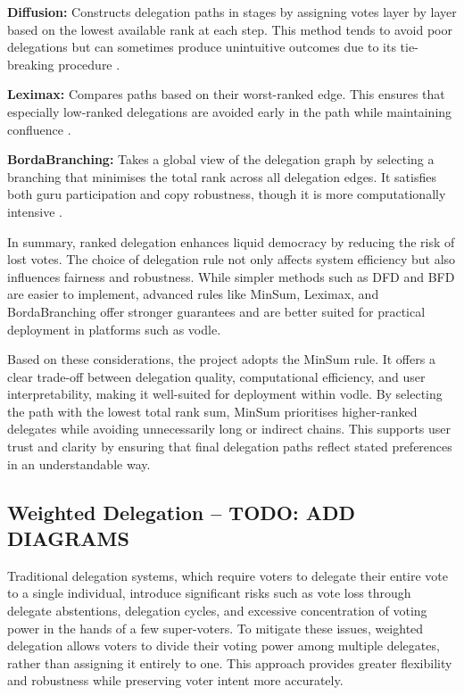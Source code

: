 \textbf{Diffusion:} Constructs delegation paths in stages by assigning votes layer by layer based on the lowest available rank at each step. This method tends to avoid poor delegations but can sometimes produce unintuitive outcomes due to its tie-breaking procedure \citep{brill_liquid_2022}.

\textbf{Leximax:} Compares paths based on their worst-ranked edge. This ensures that especially low-ranked delegations are avoided early in the path while maintaining confluence \citep{brill_liquid_2022}.

\textbf{BordaBranching:} Takes a global view of the delegation graph by selecting a branching that minimises the total rank across all delegation edges. It satisfies both guru participation and copy robustness, though it is more computationally intensive \citep{brill_liquid_2022}.

In summary, ranked delegation enhances liquid democracy by reducing the risk of lost votes. The choice of delegation rule not only affects system efficiency but also influences fairness and robustness. While simpler methods such as DFD and BFD are easier to implement, advanced rules like MinSum, Leximax, and BordaBranching offer stronger guarantees and are better suited for practical deployment in platforms such as vodle.

Based on these considerations, the project adopts the MinSum rule. It offers a clear trade-off between delegation quality, computational efficiency, and user interpretability, making it well-suited for deployment within vodle. By selecting the path with the lowest total rank sum, MinSum prioritises higher-ranked delegates while avoiding unnecessarily long or indirect chains. This supports user trust and clarity by ensuring that final delegation paths reflect stated preferences in an understandable way.


\subsection*{Weighted Delegation -- TODO: ADD DIAGRAMS}\label{subsec:background_weighted_delegation}

Traditional delegation systems, which require voters to delegate their entire vote to a single individual, introduce significant risks such as vote loss through delegate abstentions, delegation cycles, and excessive concentration of voting power in the hands of a few super-voters. To mitigate these issues, weighted delegation allows voters to divide their voting power among multiple delegates, rather than assigning it entirely to one. This approach provides greater flexibility and robustness while preserving voter intent more accurately.

